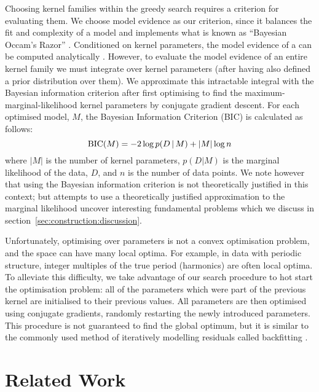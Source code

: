 Choosing kernel families within the greedy search requires a criterion for evaluating them.
We choose model evidence as our criterion, since it balances the fit and complexity of a model and implements what is known as ``Bayesian Occam's Razor'' \citep[e.g.][]{Rasmussen2001-rv, MacKay2003-rp}.
Conditioned on kernel parameters, the model evidence of a \gp{} can be computed analytically \citep[e.g.][]{Rasmussen2006-ml}.
However, to evaluate the model evidence of an entire kernel family we must integrate over kernel parameters (after having also defined a prior distribution over them). 
We approximate this intractable integral with the Bayesian information criterion \citep{Schwarz1978-wp} after first optimising to find the maximum-marginal-likelihood kernel parameters by conjugate gradient descent.
For each optimised model, $M$, the Bayesian Information Criterion (BIC) is calculated as follows:
\begin{equation}
\textrm{BIC}(M) = -2 \log p(D\,|\, M) + |M| \log n
\end{equation}
where $|M|$ is the number of kernel parameters, $p(D|M)$ is the marginal likelihood of the data, $D$, and $n$ is the number of data points.
We note however that using the Bayesian information criterion is not theoretically justified in this context; but attempts to use a theoretically justified approximation to the marginal likelihood uncover interesting fundamental problems which we discuss in section~\ref{sec:construction:discussion}.

Unfortunately, optimising over parameters is not a convex optimisation problem, and the space can have many local optima.
For example, in data with periodic structure, integer multiples of the true period (\ie harmonics) are often local optima. 
To alleviate this difficulty, we take advantage of our search procedure to hot start the optimisation problem: all of the parameters which were part of the previous kernel are initialised to their previous values.
All parameters are then optimised using conjugate gradients, randomly restarting the newly introduced parameters.
This procedure is not guaranteed to find the global optimum, but it is similar to the commonly used method of iteratively modelling residuals called backfitting \citep[e.g.][]{Hastie2009-hj}.

\section{Related Work}
\label{sec:construction:related_work}

